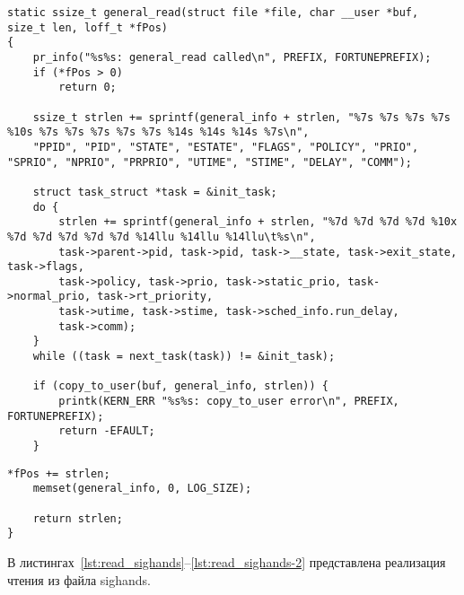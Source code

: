 \begin{lstlisting}[label=lst:read_general, caption=Реализация функции чтения из файла general]			
static ssize_t general_read(struct file *file, char __user *buf, size_t len, loff_t *fPos)
{
	pr_info("%s%s: general_read called\n", PREFIX, FORTUNEPREFIX);
	if (*fPos > 0)
		return 0;
	
	ssize_t strlen += sprintf(general_info + strlen, "%7s %7s %7s %7s %10s %7s %7s %7s %7s %7s %14s %14s %14s %7s\n", 
	"PPID", "PID", "STATE", "ESTATE", "FLAGS", "POLICY", "PRIO", "SPRIO", "NPRIO", "PRPRIO", "UTIME", "STIME", "DELAY", "COMM");
	
	struct task_struct *task = &init_task;
	do {
		strlen += sprintf(general_info + strlen, "%7d %7d %7d %7d %10x %7d %7d %7d %7d %7d %14llu %14llu %14llu\t%s\n",
		task->parent->pid, task->pid, task->__state, task->exit_state, task->flags,
		task->policy, task->prio, task->static_prio, task->normal_prio, task->rt_priority,
		task->utime, task->stime, task->sched_info.run_delay,
		task->comm);  
	}
	while ((task = next_task(task)) != &init_task);
	
	if (copy_to_user(buf, general_info, strlen)) {
		printk(KERN_ERR "%s%s: copy_to_user error\n", PREFIX, FORTUNEPREFIX);	
		return -EFAULT;
	}
\end{lstlisting}	
\begin{lstlisting}[label=lst:read_general-2, caption=Реализация функции чтения из файла general]			
	*fPos += strlen;
	memset(general_info, 0, LOG_SIZE);
	
	return strlen;
}
\end{lstlisting}

В листингах~\ref{lst:read_sighands}--\ref{lst:read_sighands-2} представлена реализация чтения из файла sighands.

